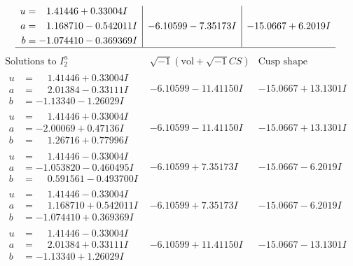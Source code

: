 \documentclass[1p]{elsarticle_modified}
\theoremstyle{definition}
\newcommand{\I}{\sqrt{-1}}
\begin{document}
$$\begin{array}{c|c|c}
\begin{aligned}
u &= \phantom{-}1.41446 + 0.33004 I \\
a &= \phantom{-}1.168710 - 0.542011 I \\
b &= -1.074410 - 0.369369 I\end{aligned}
 & -6.10599 - 7.35173 I & -15.0667 + 6.2019 I\\
 \hline 
 \end{array}$$\newpage$$\begin{array}{c|c|c}  
\text{Solutions to }I^u_{2}& \I (\text{vol} + \sqrt{-1}CS) & \text{Cusp shape}\\
 \hline 
\begin{aligned}
u &= \phantom{-}1.41446 + 0.33004 I \\
a &= \phantom{-}2.01384 - 0.33111 I \\
b &= -1.13340 - 1.26029 I\end{aligned}
 & -6.10599 - 11.41150 I & -15.0667 + 13.1301 I \\ \hline\begin{aligned}
u &= \phantom{-}1.41446 + 0.33004 I \\
a &= -2.00069 + 0.47136 I \\
b &= \phantom{-}1.26716 + 0.77996 I\end{aligned}
 & -6.10599 - 11.41150 I & -15.0667 + 13.1301 I \\ \hline\begin{aligned}
u &= \phantom{-}1.41446 - 0.33004 I \\
a &= -1.053820 - 0.460495 I \\
b &= \phantom{-}0.591561 - 0.493700 I\end{aligned}
 & -6.10599 + 7.35173 I & -15.0667 - 6.2019 I \\ \hline\begin{aligned}
u &= \phantom{-}1.41446 - 0.33004 I \\
a &= \phantom{-}1.168710 + 0.542011 I \\
b &= -1.074410 + 0.369369 I\end{aligned}
 & -6.10599 + 7.35173 I & -15.0667 - 6.2019 I \\ \hline\begin{aligned}
u &= \phantom{-}1.41446 - 0.33004 I \\
a &= \phantom{-}2.01384 + 0.33111 I \\
b &= -1.13340 + 1.26029 I\end{aligned}
 & -6.10599 + 11.41150 I & -15.0667 - 13.1301 I \\ \hline\begin{aligned}

\end{aligned}
\end{array}$$
\end{document}
